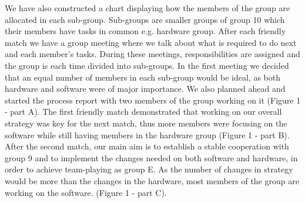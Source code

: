 \documentclass{article}
\begin{document}
We have also constructed a chart displaying how the members of the group are allocated in each sub-group. Sub-groups are smaller groups of group 10 which their members have tasks in common e.g. hardware group. After each friendly match we have a group meeting where we talk about what is required to do next and each member's tasks. During these meetings, responsibilities are assigned and the group is each time divided into sub-groups. In the first meeting we decided that an equal number of members in each sub-group would be ideal, as both hardware and software were of major importance. We also planned ahead and started the process report with two members of the group working on it (Figure 1 - part A). The first friendly match demonstrated that working on our overall strategy was key for the next match, thus more members were focusing on the software while still having members in the hardware group (Figure 1 - part B). After the second match, our main aim is to establish a stable cooperation with group 9 and to implement the changes needed on both software and hardware, in order to achieve team-playing as group E. As the number of changes in strategy would be more than the changes in the hardware, most members of the group are working on the software. (Figure 1 - part C).
\end{document}
